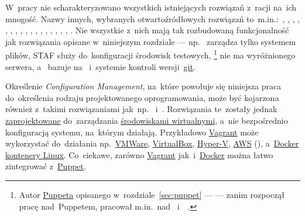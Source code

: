 \documentclass[thesis]{subfiles}
\begin{document}
W~pracy nie scharakteryzowano wszystkich istniejących rozwiązań z~racji na~ich mnogość. Nazwy innych, wybranych otwartoźródłowych rozwiązań to~m.in.:~, , \emph{\isconf{}}, , , , , , , , \emph{\radmind{}}, , \emph{\rudder{}}, , , , , . Nie wszystkie z~nich mają tak rozbudowaną funkcjonalność jak rozwiązania opisane w~niniejszym rozdziale --- np.~\radmind{} zarządza tylko systemem plików, STAF służy do~konfiguracji środowisk testowych, \isconf{}\footnote{Autor \hyperref[sec:puppet]{Puppeta} opisanego w~rozdziale~\ref{sec:puppet} --- \emph{\puppetauthor} --- zanim rozpoczął pracę nad~Puppetem, pracował m.in.~nad~\isconf{} i~\cfengine{}~\cite{luke-kanies-dblp,luke-kanies-cfengine}.} nie ma wyróżnionego serwera, a~\rudder{} bazuje na~\cfengine{} i~systemie kontroli wersji~\href{https://en.wikipedia.org/wiki/Git}{git}.

Określenie \emph{Configuration Management}, na~które powołuje się niniejsza praca do~określenia rodzaju projektowanego oprogramowania, może być kojarzona również z~takimi rozwiązaniami jak~np.~ i~. Rozwiązania te~zostały jednak \href{http://stackoverflow.com/questions/16647069/should-i-use-vagrant-or-docker-for-creating-an-isolated-environment}{zaprojektowane} do~zarządzania \href{http://stackoverflow.com/questions/16047306/how-is-docker-different-from-a-normal-virtual-machine}{środowiskami wirtualnymi}, a~nie bezpośrednio konfiguracją systemu, na~którym działają. Przykładowo \href{https://www.vagrantup.com/intro/index.html}{Vagrant} może wykorzystać do~działania np.~\href{https://en.wikipedia.org/wiki/VMware}{VMWare}, \href{https://en.wikipedia.org/wiki/VirtualBox}{VirtualBox}, \href{https://en.wikipedia.org/wiki/Hyper-V}{Hyper-V}, \href{https://en.wikipedia.org/wiki/Amazon_Web_Services}{AWS} (), a~\href{https://www.docker.com/what-docker}{Docker} \href{https://en.wikipedia.org/wiki/Linux_containers}{kontenery Linux}. Co~ciekawe, zarówno \href{https://www.vagrantup.com/docs/provisioning/puppet_apply.html}{Vagrant} jak~i~\href{https://puppet.com/presentations/using-docker-puppet-james-turnbull-kickstarter}{Docker} można łatwo zintegrować z~\hyperref[sec:puppet]{Puppet}.
\end{document}
